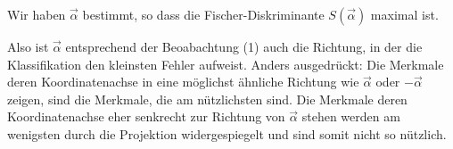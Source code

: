 \documentclass[11pt]{article}
\begin{document}
Wir haben \(\vec \alpha\) bestimmt, so dass die Fischer-Diskriminante
\(S(\vec \alpha)\) maximal ist.

Also ist \(\vec \alpha\) entsprechend der Beoabachtung (1) auch die
Richtung, in der die Klassifikation den kleinsten Fehler aufweist.
Anders ausgedrückt: Die Merkmale deren Koordinatenachse in eine
möglichst ähnliche Richtung wie \(\vec \alpha\) oder \(-\vec \alpha\)
zeigen, sind die Merkmale, die am nützlichsten sind. Die Merkmale deren
Koordinatenachse eher senkrecht zur Richtung von \(\vec \alpha\) stehen
werden am wenigsten durch die Projektion widergespiegelt und sind somit
nicht so nützlich.


    
    
    
    
\end{document}
